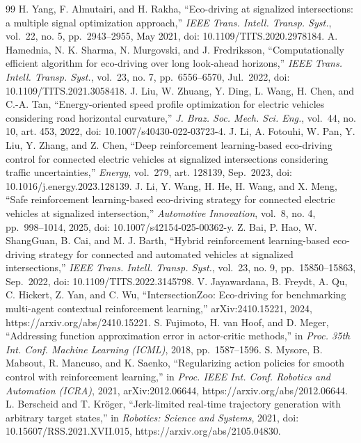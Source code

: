 \documentclass[letterpaper,journal]{IEEEtran}
\begin{document}
\begin{thebibliography}{99}
 H. Yang, F. Almutairi, and H. Rakha, ``Eco-driving at signalized intersections: a multiple signal optimization approach,'' \emph{IEEE Trans. Intell. Transp. Syst.}, vol.~22, no. 5, pp.~2943--2955, May 2021, doi: 10.1109/TITS.2020.2978184.
 A. Hamednia, N. K. Sharma, N. Murgovski, and J. Fredriksson, ``Computationally efficient algorithm for eco-driving over long look-ahead horizons,'' \emph{IEEE Trans. Intell. Transp. Syst.}, vol.~23, no. 7, pp.~6556--6570, Jul.~2022, doi: 10.1109/TITS.2021.3058418.
 J. Liu, W. Zhuang, Y. Ding, L. Wang, H. Chen, and C.-A. Tan, ``Energy-oriented speed profile optimization for electric vehicles considering road horizontal curvature,'' \emph{J. Braz. Soc. Mech. Sci. Eng.}, vol.~44, no. 10, art. 453, 2022, doi: 10.1007/s40430-022-03723-4.
 J. Li, A. Fotouhi, W. Pan, Y. Liu, Y. Zhang, and Z. Chen, ``Deep reinforcement learning-based eco-driving control for connected electric vehicles at signalized intersections considering traffic uncertainties,'' \emph{Energy}, vol.~279, art. 128139, Sep.~2023, doi: 10.1016/j.energy.2023.128139.
 J. Li, Y. Wang, H. He, H. Wang, and X. Meng, ``Safe reinforcement learning-based eco-driving strategy for connected electric vehicles at signalized intersection,'' \emph{Automotive Innovation}, vol.~8, no. 4, pp.~998--1014, 2025, doi: 10.1007/s42154-025-00362-y.
 Z. Bai, P. Hao, W. ShangGuan, B. Cai, and M. J. Barth, ``Hybrid reinforcement learning-based eco-driving strategy for connected and automated vehicles at signalized intersections,'' \emph{IEEE Trans. Intell. Transp. Syst.}, vol.~23, no. 9, pp.~15850--15863, Sep.~2022, doi: 10.1109/TITS.2022.3145798.
 V. Jayawardana, B. Freydt, A. Qu, C. Hickert, Z. Yan, and C. Wu, ``IntersectionZoo: Eco-driving for benchmarking multi-agent contextual reinforcement learning,'' arXiv:2410.15221, 2024, https://arxiv.org/abs/2410.15221.
 S. Fujimoto, H. van Hoof, and D. Meger, ``Addressing function approximation error in actor-critic methods,'' in \emph{Proc. 35th Int. Conf. Machine Learning (ICML)}, 2018, pp.~1587--1596.
 S. Mysore, B. Mabsout, R. Mancuso, and K. Saenko, ``Regularizing action policies for smooth control with reinforcement learning,'' in \emph{Proc. IEEE Int. Conf. Robotics and Automation (ICRA)}, 2021, arXiv:2012.06644, https://arxiv.org/abs/2012.06644.
 L. Berscheid and T. Kröger, ``Jerk-limited real-time trajectory generation with arbitrary target states,'' in \emph{Robotics: Science and Systems}, 2021, doi: 10.15607/RSS.2021.XVII.015, https://arxiv.org/abs/2105.04830.

\end{thebibliography}
\end{document}
